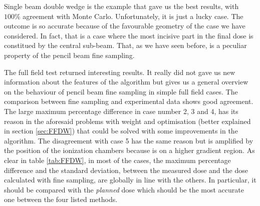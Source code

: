 \documentclass[12pt, a4paper, twoside]{book}
\begin{document}
Single beam double wedge is the example that gave us the best results, with $100\%$ agreement with Monte Carlo. Unfortunately, it is just a lucky case. The outcome is so accurate because of the favourable geometry of the case we have considered. In fact, that is a case where the most incisive part in the final dose is constitued by the central sub-beam. That, as we have seen before, is a peculiar property of the pencil beam fine sampling.

The full field test returned interesting results. It really did not gave us new information about the features of the algorithm but gives us a general overview on the behaviour of pencil beam fine sampling in simple full field cases. The comparison between fine sampling and experimental data shows good agreement. 
The large maximum percentage difference in case number 2, 3 and 4, has its reason in the aforesaid problems with weight and optimisation (better explained in section \ref{sec:FFDW}) that could be solved with some improvements in the algorithm. The disagreement with case 5 has the same reason but is amplified by the position of the ionization chambers because is on a higher gradient region.
As clear in table \ref{tab:FFDW},  in most of the cases, the maximum percentage difference and the standard deviation, between the measured dose and the dose calculated with fine sampling, are globally in line with the others. In particular, it should be compared with the \emph{planned} dose which should be the most accurate one between the four listed methods.
\end{document}
